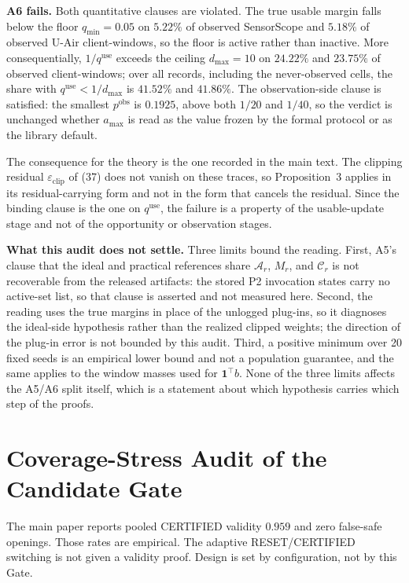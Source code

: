 \noindent\textbf{A6 fails.}  Both quantitative clauses are violated.  The
true usable margin falls below the floor $q_{\min}=0.05$ on $5.22\%$ of
observed SensorScope and $5.18\%$ of observed U-Air client-windows, so the
floor is active rather than inactive.  More consequentially,
$1/q^{\mathrm{use}}$ exceeds the ceiling $d_{\max}=10$ on $24.22\%$ and
$23.75\%$ of observed client-windows; over all records, including the
never-observed cells, the share with $q^{\mathrm{use}}<1/d_{\max}$ is
$41.52\%$ and $41.86\%$.  The observation-side clause is satisfied: the
smallest $p^{\mathrm{obs}}$ is $0.1925$, above both $1/20$ and $1/40$, so the
verdict is unchanged whether $a_{\max}$ is read as the value frozen by the
formal protocol or as the library default.

The consequence for the theory is the one recorded in the main text.  The
clipping residual $\varepsilon_{\mathrm{clip}}$ of (37) does
not vanish on these traces, so Proposition~3 applies in its
residual-carrying form and not in the form that cancels the residual.  Since
the binding clause is the one on $q^{\mathrm{use}}$, the failure is a property
of the usable-update stage and not of the opportunity or observation stages.

\noindent\textbf{What this audit does not settle.}  Three limits bound the
reading.  First, A5's clause that the ideal and practical references share
$\mathcal{A}_r$, $M_r$, and $\mathcal{C}_r$ is not recoverable from the
released artifacts: the stored P2 invocation states carry no active-set list,
so that clause is asserted and not measured here.  Second, the reading uses
the true margins in place of the unlogged plug-ins, so it diagnoses the
ideal-side hypothesis rather than the realized clipped weights; the direction
of the plug-in error is not bounded by this audit.  Third, a positive minimum
over 20 fixed seeds is an empirical lower bound and not a population
guarantee, and the same applies to the window masses used for
$\mathbf{1}^{\top}b$.  None of the three limits affects the A5/A6 split
itself, which is a statement about which hypothesis carries which step of the
proofs.


\section{Coverage-Stress Audit of the Candidate Gate}
\label{app:certificate_audit}

The main paper reports pooled CERTIFIED validity $0.959$ and zero
false-safe openings.  Those rates are empirical.  The adaptive
RESET/CERTIFIED switching is not given a validity proof.
Design is set by configuration, not by this Gate.

